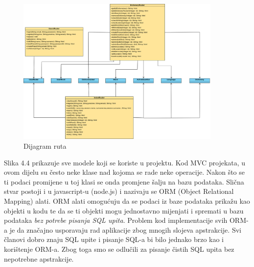 				\begin{figure}[H]
					\includegraphics[width=0.9\textwidth]{dijagrami/slika2.png} 
					\centering
					\caption{Dijagram ruta}
					\label{fig:class_diagram}
				\end{figure}			
			\eject
            Slika 4.4 prikazuje sve modele koji se koriste u projektu. Kod MVC projekata, u ovom dijelu su često neke klase nad kojoma se rade neke operacije. Nakon što se ti podaci promijene u toj klasi se onda promjene šalju na bazu podataka.
            Slična stvar postoji i u javascript-u (node.js) i nazivaju se ORM (Object Relational Mapping) alati. ORM alati omogućuju da se podaci iz baze podataka prikažu kao objekti u kodu te da se ti objekti mogu jednostavno mijenjati i spremati u bazu podataka \textit{bez potrebe pisanja SQL upita}.
            Problem kod implementacije svih ORM-a je da značajno usporavaju rad aplikacije zbog mnogih slojeva apstrakcije. Svi članovi dobro znaju SQL upite i pisanje SQL-a bi bilo jednako brzo kao i korištenje ORM-a. Zbog toga smo se odlučili za pisanje čistih SQL upita bez nepotrebne apstrakcije.
